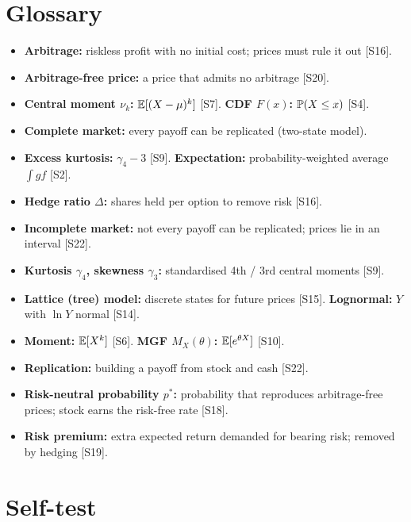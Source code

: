 \documentclass[10pt]{article}
\begin{document}
\section{Glossary}
\begin{itemize}
\item \textbf{Arbitrage:} riskless profit with no initial cost; prices must rule it out [S16].
\item \textbf{Arbitrage-free price:} a price that admits no arbitrage [S20].
\item \textbf{Central moment $\nu_k$:} $\mathbb{E}[(X-\mu)^k]$ [S7]. \quad \textbf{CDF $F(x)$:} $\mathbb{P}(X\le x)$ [S4].
\item \textbf{Complete market:} every payoff can be replicated (two-state model).
\item \textbf{Excess kurtosis:} $\gamma_4-3$ [S9]. \quad \textbf{Expectation:} probability-weighted average $\int gf$ [S2].
\item \textbf{Hedge ratio $\Delta$:} shares held per option to remove risk [S16].
\item \textbf{Incomplete market:} not every payoff can be replicated; prices lie in an interval [S22].
\item \textbf{Kurtosis $\gamma_4$, skewness $\gamma_3$:} standardised 4th / 3rd central moments [S9].
\item \textbf{Lattice (tree) model:} discrete states for future prices [S15]. \quad \textbf{Lognormal:} $Y$ with $\ln Y$ normal [S14].
\item \textbf{Moment:} $\mathbb{E}[X^k]$ [S6]. \quad \textbf{MGF $M_X(\theta)$:} $\mathbb{E}[e^{\theta X}]$ [S10].
\item \textbf{Replication:} building a payoff from stock and cash [S22].
\item \textbf{Risk-neutral probability $p^*$:} probability that reproduces arbitrage-free prices; stock earns the risk-free rate [S18].
\item \textbf{Risk premium:} extra expected return demanded for bearing risk; removed by hedging [S19].
\end{itemize}

\section{Self-test}
\end{document}
